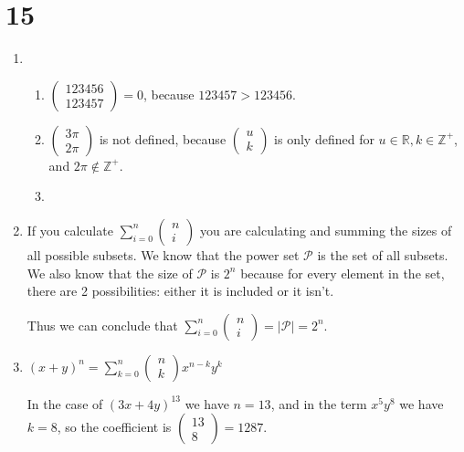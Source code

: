 \documentclass[12pt]{article}
\begin{document}
\section*{15}
\begin{enumerate}[a]
	\item %
	\begin{enumerate}[i]
		\item %
		$\begin{pmatrix}
			123456 \\ 123457
		\end{pmatrix} = 0$, because $123457 > 123456$.
		\item %
		$\begin{pmatrix}
			3 \pi \\ 2 \pi
		\end{pmatrix}$ is not defined, because $\begin{pmatrix}
			u \\ k
		\end{pmatrix}$ is only defined for $u \in \mathbb{R}, k \in \mathbb{Z}^+$, and $2 \pi \not \in \mathbb{Z}^+$.
		\item %
	\end{enumerate}
	\item %
	If you calculate $\sum_{i = 0}^{n} \begin{pmatrix}
		n \\ i
	\end{pmatrix}$ you are calculating and summing the sizes of all possible subsets. We know that the power set $\mathcal{P}$ is the set of all subsets. We also know that the size of $\mathcal{P}$ is $2^n$ because for every element in the set, there are 2 possibilities: either it is included or it isn't.

	Thus we can conclude that $\sum_{i = 0}^{n} \begin{pmatrix}
		n \\ i
	\end{pmatrix} = | \mathcal{P} | = 2^n$.
	\item %
	$(x + y)^n = \sum_{k = 0}^n \begin{pmatrix}
		n \\ k
	\end{pmatrix} x^{n - k} y^k$

	In the case of $(3x + 4y)^{13}$ we have $n = 13$, and in the term $x^5 y^8$ we have $k = 8$, so the coefficient is $\begin{pmatrix}
		13 \\ 8
	\end{pmatrix} = 1287$.
\end{enumerate}
\end{document}
